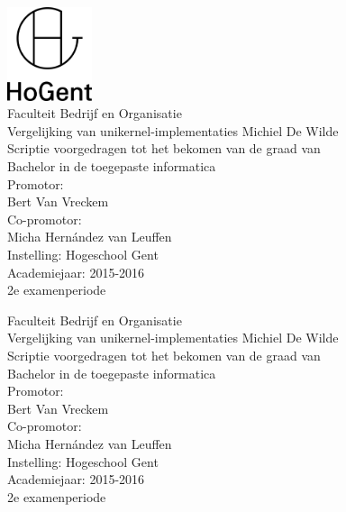 \documentclass[pdftex,a4paper,12pt,twoside]{report}
\newcommand{\emptypage}{
\newpage
\thispagestyle{empty}
\mbox{}
\newpage
}
\newcommand{\student}{Michiel De Wilde}
\newcommand{\promotor}{Bert Van Vreckem}
\newcommand{\copromotor}{Micha Hernández van Leuffen}
\newcommand{\instelling}{Hogeschool Gent}
\newcommand{\titel}{Vergelijking van unikernel-implementaties}
\newcommand{\faculteit}{Faculteit Bedrijf en Organisatie}
\newcommand{\rapporttype}{Scriptie voorgedragen tot het bekomen van de graad van\\Bachelor in de toegepaste informatica}
\newcommand{\academiejaar}{2015-2016}
\newcommand{\examenperiode}{2e examenperiode}
\begin{document}

\begin{titlepage}
  \begin{center}

    \begingroup
    \rmfamily
    \includegraphics[width=2.5cm]{img/HG-beeldmerk-woordmerk}\\[.5cm]
    \faculteit\\[3cm]
    \titel
    \vfill
    \student\\[3.5cm]
    \rapporttype\\[2cm]
    Promotor:\\
    \promotor\\
    Co-promotor:\\
    \copromotor\\[2.5cm]
    Instelling: \instelling\\[.5cm]
    Academiejaar: \academiejaar\\[.5cm]
    \examenperiode
    \endgroup

  \end{center}
  \restoregeometry
\end{titlepage}


\emptypage


\begin{titlepage}
  \begin{center}

    \begingroup
    \rmfamily
    \faculteit\\[3cm]
    \titel
    \vfill
    \student\\[3.5cm]
    \rapporttype\\[2cm]
    Promotor:\\
    \promotor\\
    Co-promotor:\\
    \copromotor\\[2.5cm]
    Instelling: \instelling\\[.5cm]
    Academiejaar: \academiejaar\\[.5cm]
    \examenperiode
    \endgroup

  \end{center}
  \restoregeometry
\end{titlepage}
\end{document}
